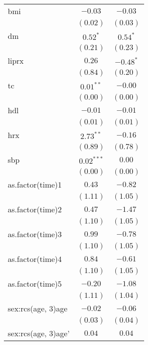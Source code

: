 \begin{tabular}{l c c}
bmi                   & $-0.03$       & $-0.03$       \\
                      & $(0.02)$      & $(0.03)$      \\
dm                    & $0.52^{*}$    & $0.54^{*}$    \\
                      & $(0.21)$      & $(0.23)$      \\
liprx                 & $0.26$        & $-0.48^{*}$   \\
                      & $(0.84)$      & $(0.20)$      \\
tc                    & $0.01^{**}$   & $-0.00$       \\
                      & $(0.00)$      & $(0.00)$      \\
hdl                   & $-0.01$       & $-0.01$       \\
                      & $(0.01)$      & $(0.01)$      \\
hrx                   & $2.73^{**}$   & $-0.16$       \\
                      & $(0.89)$      & $(0.78)$      \\
sbp                   & $0.02^{***}$  & $0.00$        \\
                      & $(0.00)$      & $(0.00)$      \\
as.factor(time)1      & $0.43$        & $-0.82$       \\
                      & $(1.11)$      & $(1.05)$      \\
as.factor(time)2      & $0.47$        & $-1.47$       \\
                      & $(1.10)$      & $(1.05)$      \\
as.factor(time)3      & $0.99$        & $-0.78$       \\
                      & $(1.10)$      & $(1.05)$      \\
as.factor(time)4      & $0.84$        & $-0.61$       \\
                      & $(1.10)$      & $(1.05)$      \\
as.factor(time)5      & $-0.20$       & $-1.08$       \\
                      & $(1.11)$      & $(1.04)$      \\
sex:rcs(age, 3)age    & $-0.02$       & $-0.06$       \\
                      & $(0.03)$      & $(0.04)$      \\
sex:rcs(age, 3)age'   & $0.04$        & $0.04$        \\

\end{tabular}
